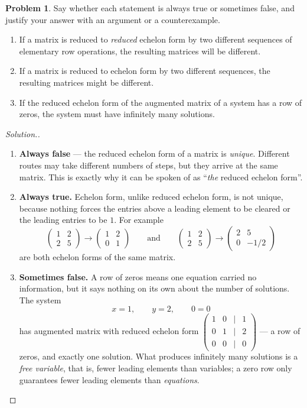 \documentclass[11pt,a4paper]{article}
\theoremstyle{definition}
\newtheorem{problemx}{Problem}[section]
\newenvironment{problem}{\begin{problemx}}{\end{problemx}}
\newenvironment{solution}
  {\renewcommand{\qedsymbol}{}\begin{proof}[\textit{Solution}.]}
  {\end{proof}}
\begin{document}
\begin{problem}
Say whether each statement is always true or sometimes false, and justify your
answer with an argument or a counterexample.
\begin{enumerate}
\item[(a)] If a matrix is reduced to \emph{reduced} echelon form by two
different sequences of elementary row operations, the resulting matrices will
be different.
\item[(b)] If a matrix is reduced to echelon form by two different sequences,
the resulting matrices might be different.
\item[(c)] If the reduced echelon form of the augmented matrix of a system has
a row of zeros, the system must have infinitely many solutions.
\end{enumerate}
\end{problem}
\begin{solution}
\begin{enumerate}
\item[(a)] \textbf{Always false} --- the reduced echelon form of a matrix is
\emph{unique}. Different routes may take different numbers of steps, but they
arrive at the same matrix. This is exactly why it can be spoken of as
``\emph{the} reduced echelon form''.

\item[(b)] \textbf{Always true.} Echelon form, unlike reduced echelon form,
is not unique, because nothing forces the entries above a leading element to be
cleared or the leading entries to be $1$. For example
$$\begin{pmatrix}1&2\\2&5\end{pmatrix}\longrightarrow
\begin{pmatrix}1&2\\0&1\end{pmatrix}
\qquad\text{and}\qquad
\begin{pmatrix}1&2\\2&5\end{pmatrix}\longrightarrow
\begin{pmatrix}2&5\\0&-1/2\end{pmatrix}$$
are both echelon forms of the same matrix.

\item[(c)] \textbf{Sometimes false.} A row of zeros means one equation carried
no information, but it says nothing on its own about the number of solutions.
The system
$$x=1,\qquad y=2,\qquad 0=0$$
has augmented matrix with reduced echelon form
$\begin{pmatrix}1&0&|&1\\0&1&|&2\\0&0&|&0\end{pmatrix}$ --- a row of zeros, and
exactly one solution. What produces infinitely many solutions is a
\emph{free variable}, that is, fewer leading elements than variables; a zero
row only guarantees fewer leading elements than \emph{equations}.
\end{enumerate}
\end{solution}
\end{document}
